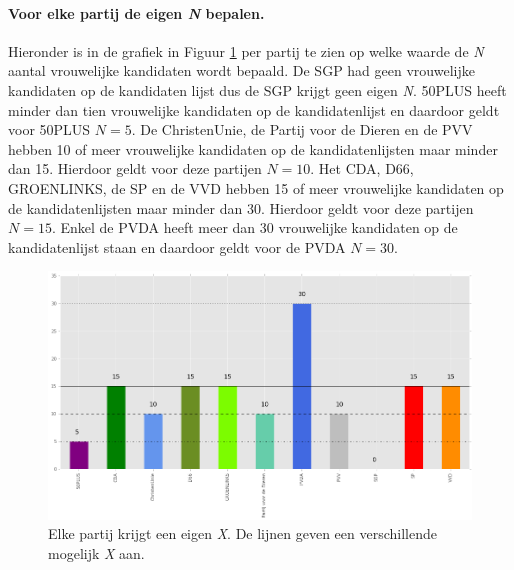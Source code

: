 \paragraph{Voor elke partij de eigen \textit{N} bepalen.}
Hieronder is in de grafiek in Figuur \ref{fig:XV} per partij te zien op welke waarde de \textit{N} aantal vrouwelijke kandidaten wordt bepaald. De SGP had geen vrouwelijke kandidaten op de kandidaten lijst dus de SGP krijgt geen eigen \textit{N}. 50PLUS heeft minder dan tien vrouwelijke kandidaten op de kandidatenlijst en daardoor geldt voor 50PLUS $N=5$. De ChristenUnie, de Partij voor de Dieren en de PVV hebben 10 of meer vrouwelijke kandidaten op de kandidatenlijsten maar minder dan 15. Hierdoor geldt voor deze partijen $N=10$. Het CDA, D66, GROENLINKS, de SP en de VVD hebben 15 of meer vrouwelijke kandidaten op de kandidatenlijsten maar minder dan 30. Hierdoor geldt voor deze partijen $N=15$. Enkel de PVDA heeft meer dan 30 vrouwelijke kandidaten op de kandidatenlijst staan en daardoor geldt voor de PVDA $N=30$.

\begin{figure}[H]

	\includegraphics[width=\linewidth]{eigenX_partijen.png}

			\caption{Elke partij krijgt een eigen \textit{X}. De lijnen geven een verschillende mogelijk \textit{X} aan.}

\label{fig:XV}
\end{figure}

